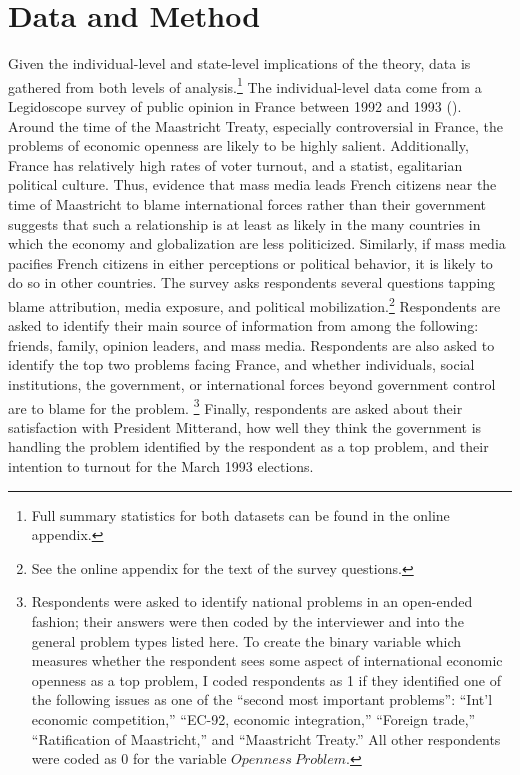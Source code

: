 \documentclass[12pt]{report}
\begin{document}
\section{Data and Method}

Given the individual-level and state-level implications of the theory, data is gathered from both
levels of analysis.\footnote{Full summary statistics for both datasets can be found in the online
appendix.} The individual-level data come from a Legidoscope survey of public opinion in France
between 1992 and 1993 (\citealt{Chrique:1993us}). Around the time of the Maastricht Treaty,
especially controversial in France, the problems of economic openness are likely to be highly
salient. Additionally, France has relatively high rates of voter turnout, and a statist, egalitarian
political culture. Thus, evidence that mass media leads French citizens near the time of Maastricht
to blame international forces rather than their government suggests that such a relationship is at
least as likely in the many countries in which the economy and globalization are less politicized.
Similarly, if mass media pacifies French citizens in either perceptions or political behavior, it is
likely to do so in other countries. The survey asks respondents several questions tapping blame
attribution, media exposure, and political mobilization.\footnote{See the online appendix for the
text of the survey questions.} Respondents are asked to identify their main source of information
from among the following: friends, family, opinion leaders, and mass media. Respondents are also
asked to identify the top two problems facing France, and whether individuals, social institutions,
the government, or international forces beyond government control are to blame for the problem.
\footnote{Respondents were asked to identify national problems in an open-ended fashion; their
answers were then coded by the interviewer and into the general problem types listed here. To create
the binary variable which measures whether the respondent sees some aspect of international economic
openness as a top problem, I coded respondents as 1 if they identified one of the following issues
as one of the ``second most important problems'': ``Int\textquoteright{}l economic competition,''
``EC-92, economic integration,'' ``Foreign trade,'' ``Ratification of Maastricht,'' and ``Maastricht
Treaty.'' All other respondents were coded as 0 for the variable $Openness\: Problem$.} Finally,
respondents are asked about their satisfaction with President Mitterand, how well they think the
government is handling the problem identified by the respondent as a top problem, and their
intention to turnout for the March 1993 elections.
\end{document}
